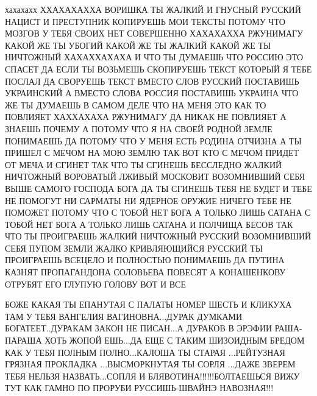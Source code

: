 хахахахх ХХАХАХАХХА ВОРИШКА ТЫ ЖАЛКИЙ И ГНУСНЫЙ РУССКИЙ НАЦИСТ И ПРЕСТУПНИК КОПИРУЕШЬ
МОИ ТЕКСТЫ ПОТОМУ ЧТО МОЗГОВ У ТЕБЯ СВОИХ НЕТ СОВЕРШЕННО ХАХАХАХХА РЖУНИМАГУ
КАКОЙ ЖЕ ТЫ УБОГИЙ КАКОЙ ЖЕ ТЫ ЖАЛКИЙ КАКОЙ ЖЕ ТЫ НИЧТОЖНЫЙ ХАХАХХАХАХА
И ЧТО ТЫ ДУМАЕШЬ ЧТО РОССИЮ ЭТО СПАСЕТ ДА ЕСЛИ ТЫ ВОЗЬМЕШЬ СКОПИРУЕШЬ ТЕКСТ
КОТОРЫЙ Я ТЕБЕ ПОСЛАЛ ДА СВОРУЕШЬ ТЕКСТ ВМЕСТО СЛОВ РУССКИЙ ПОСТАВИШЬ УКРАИНСКИЙ
А ВМЕСТО СЛОВА РОССИЯ ПОСТАВИШЬ УКРАИНА ЧТО ЖЕ ТЫ ДУМАЕШЬ В САМОМ ДЕЛЕ
ЧТО НА МЕНЯ ЭТО КАК ТО ПОВЛИЯЕТ ХАХХАХАХА РЖУНИМАГУ ДА НИКАК НЕ ПОВЛИЯЕТ А ЗНАЕШЬ ПОЧЕМУ
А ПОТОМУ ЧТО Я НА СВОЕЙ РОДНОЙ ЗЕМЛЕ ПОНИМАЕШЬ ДА ПОТОМУ ЧТО У МЕНЯ ЕСТЬ РОДИНА ОТЧИЗНА
А ТЫ ПРИШЕЛ С МЕЧОМ НА МОЮ ЗЕМЛЮ ТАК ВОТ КТО С МЕЧОМ ПРИДЕТ ОТ МЕЧА И СГИНЕТ ТАК ЧТО
ТЫ СГИНЕШЬ БЕССЛЕДНО ЖАЛКИЙ НИЧТОЖНЫЙ ВОРОВАТЫЙ ЛЖИВЫЙ МОСКОВИТ ВОЗОМНИВШИЙ СЕБЯ ВЫШЕ САМОГО ГОСПОДА 
БОГА ДА ТЫ СГИНЕШЬ ТЕБЯ НЕ БУДЕТ И ТЕБЕ НЕ ПОМОГУТ НИ САРМАТЫ НИ ЯДЕРНОЕ ОРУЖИЕ НИЧЕГО
ТЕБЕ НЕ ПОМОЖЕТ ПОТОМУ ЧТО С ТОБОЙ НЕТ БОГА А ТОЛЬКО ЛИШЬ САТАНА С ТОБОЙ НЕТ БОГА А ТОЛЬКО ЛИШЬ
САТАНА И ПОЛЧИЩА БЕСОВ ТАК ЧТО ТЫ ПРОИГРАЕШЬ ЖАЛКИЙ НИЧТОЖНЫЙ РУССКИЙ ВОЗОМНИВШИЙ СЕБЯ ПУПОМ ЗЕМЛИ
ЖАЛКО КРИВЛЯЮЩИЙСЯ РУССКИЙ ТЫ ПРОИГРАЕШЬ ВСЕЦЕЛО И ПОЛНОСТЬЮ ПОНИМАЕШЬ ДА
ПУТИНА КАЗНЯТ ПРОПАГАНДОНА СОЛОВЬЕВА ПОВЕСЯТ А КОНАШЕНКОВУ ОТРУБЯТ ЕГО ГЛУПУЮ ГОЛОВУ
ВОТ И ВСЕ

БОЖЕ КАКАЯ ТЫ ЕПАНУТАЯ С ПАЛАТЫ НОМЕР ШЕСТЬ И КЛИКУХА ТАМ У ТЕБЯ ВАНГЕЛИЯ
ВАГИНОВНА...ДУРАК ДУМКАМИ БОГАТЕЕТ..ДУРАКАМ ЗАКОН НЕ ПИСАН...А ДУРАКОВ В ЭРЭФИИ
РАША-ПАРАША ХОТЬ ЖОПОЙ ЕШЬ...ДА ЕЩЕ С ТАКИМ ШИЗОИДНЫМ БРЕДОМ КАК У ТЕБЯ ПОЛНЫМ
ПОЛНО...КАЛОША ТЫ СТАРАЯ ...РЕЙТУЗНАЯ ГРЯЗНАЯ ПРОКЛАДКА ...ВЫСМОРКНУТАЯ ТЫ
СОРЛЯ ...ДАЖЕ ЗВЕРЕМ ТЕБЯ НЕЛЬЗЯ НАЗВАТЬ...СОПЛЯ И БЛЯВОТИНА!!!!!!БОЛТАЕШЬСЯ
ВИЖУ ТУТ КАК ГАМНО ПО ПРОРУБИ РУССИШЬ-ШВАЙНЭ НАВОЗНАЯ!!!

